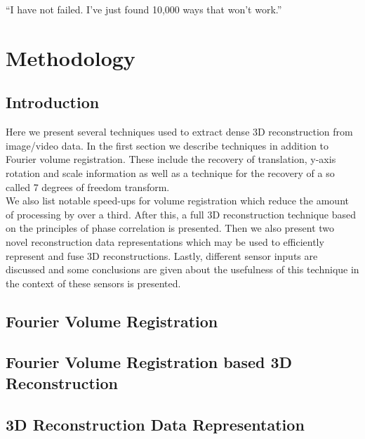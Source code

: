 \begin{savequote}[8cm]
  ``I have not failed. I've just found 10,000 ways that won't work.''
\end{savequote}
\makeatletter
\chapter{Methodology}

\section{Introduction}

Here we present several techniques used to extract dense 3D reconstruction from image/video data. In the first section we describe techniques in addition to Fourier volume registration. These include the recovery of translation, y-axis rotation and scale information as well as a technique for the recovery of a so called 7 degrees of freedom transform. \\

We also list notable speed-ups for volume registration which reduce the amount of processing by over a third. After this, a full 3D reconstruction technique based on the principles of phase correlation is presented. Then we also present two novel reconstruction data representations which may be used to efficiently represent and fuse 3D reconstructions. Lastly, different sensor inputs are discussed and some conclusions are given about the usefulness of this technique in the context of these sensors is presented.

\section{Fourier Volume Registration} 





\section{Fourier Volume Registration based 3D Reconstruction}



\section{3D Reconstruction Data Representation}
\label{sec:3DDataRepresentations}

